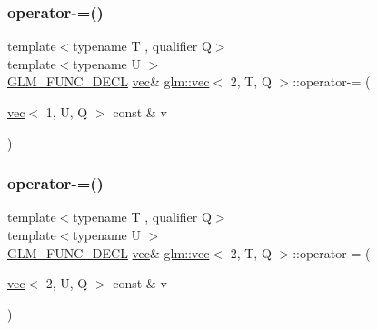 \mbox{\label{structglm_1_1vec_3_012_00_01_t_00_01_q_01_4_ad0145e78e71199aad6aa61d5e899f1eb}} 
\subsubsection{\texorpdfstring{operator-\/=()}{operator-=()}\hspace{0.1cm}{\footnotesize\ttfamily [2/6]}}
{\footnotesize\ttfamily template$<$typename T , qualifier Q$>$ \\
template$<$typename U $>$ \\
\hyperlink{setup_8hpp_ab2d052de21a70539923e9bcbf6e83a51}{G\+L\+M\+\_\+\+F\+U\+N\+C\+\_\+\+D\+E\+CL} \hyperlink{structglm_1_1vec}{vec}\& \hyperlink{structglm_1_1vec}{glm\+::vec}$<$ 2, T, Q $>$\+::operator-\/= (\begin{DoxyParamCaption}\item[{\hyperlink{structglm_1_1vec}{vec}$<$ 1, U, Q $>$ const \&}]{v }\end{DoxyParamCaption})}

\mbox{\label{structglm_1_1vec_3_012_00_01_t_00_01_q_01_4_a8051ed9c25b34e08a29f6eee8d0ea3dc}} 
\subsubsection{\texorpdfstring{operator-\/=()}{operator-=()}\hspace{0.1cm}{\footnotesize\ttfamily [3/6]}}
{\footnotesize\ttfamily template$<$typename T , qualifier Q$>$ \\
template$<$typename U $>$ \\
\hyperlink{setup_8hpp_ab2d052de21a70539923e9bcbf6e83a51}{G\+L\+M\+\_\+\+F\+U\+N\+C\+\_\+\+D\+E\+CL} \hyperlink{structglm_1_1vec}{vec}\& \hyperlink{structglm_1_1vec}{glm\+::vec}$<$ 2, T, Q $>$\+::operator-\/= (\begin{DoxyParamCaption}\item[{\hyperlink{structglm_1_1vec}{vec}$<$ 2, U, Q $>$ const \&}]{v }\end{DoxyParamCaption})}

